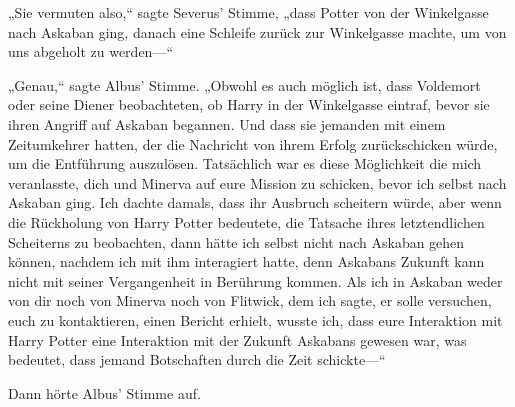 „Sie vermuten also,“ sagte Severus' Stimme, „dass Potter von der Winkelgasse nach Askaban ging, danach eine Schleife zurück zur Winkelgasse machte, um von uns abgeholt zu werden—“

„Genau,“ sagte Albus' Stimme. „Obwohl es auch möglich ist, dass Voldemort oder seine Diener beobachteten, ob Harry in der Winkelgasse eintraf, bevor sie ihren Angriff auf Askaban begannen. Und dass sie jemanden mit einem Zeitumkehrer hatten, der die Nachricht von ihrem Erfolg zurückschicken würde, um die Entführung auszulösen. Tatsächlich war es diese Möglichkeit die mich veranlasste, dich und Minerva auf eure Mission zu schicken, bevor ich selbst nach Askaban ging. Ich dachte damals, dass ihr Ausbruch scheitern würde, aber wenn die Rückholung von Harry Potter bedeutete, die Tatsache ihres letztendlichen Scheiterns zu beobachten, dann hätte ich selbst nicht nach Askaban gehen können, nachdem ich mit ihm interagiert hatte, denn Askabans Zukunft kann nicht mit seiner Vergangenheit in Berührung kommen. Als ich in Askaban weder von dir noch von Minerva noch von Flitwick, dem ich sagte, er solle versuchen, euch zu kontaktieren, einen Bericht erhielt, wusste ich, dass eure Interaktion mit Harry Potter eine Interaktion mit der Zukunft Askabans gewesen war, was bedeutet, dass jemand Botschaften durch die Zeit schickte—“

Dann hörte Albus' Stimme auf.

